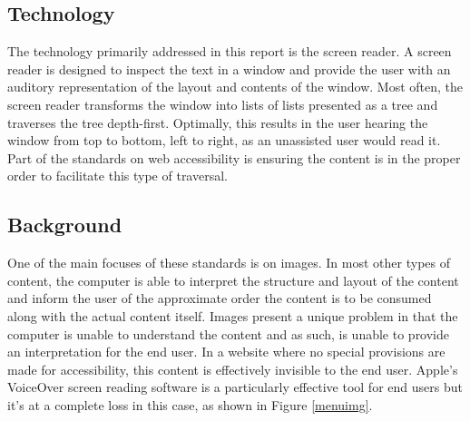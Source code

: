\documentclass[]{article}
\begin{document}
\subsection{Technology}\label{technology}

The technology primarily addressed in this report is the screen reader.
A screen reader is designed to inspect the text in a window and provide
the user with an auditory representation of the layout and contents of
the window. Most often, the screen reader transforms the window into
lists of lists presented as a tree and traverses the tree depth-first.
Optimally, this results in the user hearing the window from top to
bottom, left to right, as an unassisted user would read it. Part of the
standards on web accessibility is ensuring the content is in the proper
order to facilitate this type of traversal.

\subsection{Background}\label{background}

One of the main focuses of these standards is on images. In most other
types of content, the computer is able to interpret the structure and
layout of the content and inform the user of the approximate order the
content is to be consumed along with the actual content itself. Images
present a unique problem in that the computer is unable to understand
the content and as such, is unable to provide an interpretation for the
end user. In a website where no special provisions are made for
accessibility, this content is effectively invisible to the end user.
Apple's VoiceOver screen reading software is a particularly effective
tool for end users but it's at a complete loss in this case, as shown in
Figure \ref{menuimg}.
\end{document}
